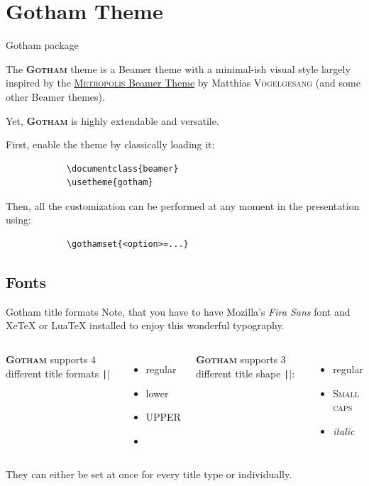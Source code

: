\documentclass[aspectratio=169]{beamer}
\newcommand{\famName}[1]{\textsc{#1}}
\newcommand{\themename}{\textbf{\textsc{Gotham}}}
\begin{document}
\section{Gotham Theme}

	\begin{frame}[fragile]{Gotham package}

		The \themename{} theme is a Beamer theme with a minimal-ish visual style largely inspired by the \href{https://github.com/matze/mtheme}{\textsc{Metropolis} Beamer Theme} by Matthias \famName{Vogelgesang} (and some other Beamer themes).

		Yet, \themename{} is highly extendable and versatile.
		\bigskip

		First, enable the theme by classically loading it:

		\begin{verbatim}
			\documentclass{beamer}
			\usetheme{gotham}
		\end{verbatim}

		Then, all the customization can be performed at any moment in the presentation using:

		\begin{verbatim}
			\gothamset{<option>=...}
		\end{verbatim}
	\end{frame}


\subsection{Fonts}

	\begin{frame}[fragile]{Gotham title formats}
		Note, that you have to have Mozilla's \emph{Fira Sans} font and XeTeX or LuaTeX installed to enjoy this wonderful typography.

		\begin{columns}[T,onlytextwidth]
			\themename{} supports 4 different title formats \texttt||
			\begin{itemize}
				\item regular
				\item \MakeLowercase{Lower}
				\item \MakeUppercase{Upper}
				\item {}
			\end{itemize}
			\themename{} supports 3 different title shape \texttt||:
			\begin{itemize}
				\item regular
				\item \textsc{Small caps}
				\item \textit{italic}
			\end{itemize}
		\end{columns}

		\vspace{2em}
		They can either be set at once for every title type or individually.
	\end{frame}
\end{document}
